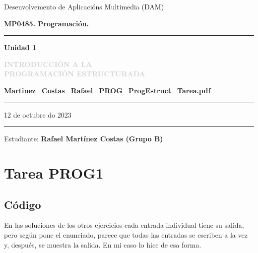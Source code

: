 \documentclass[a4paper,12pt]{article}
\def\curso{Desenvolvemento de Aplicacións Multimedia (DAM)}
\def\asignatura{MP0485. Programación.}
\def\ud{Unidad 1}
\def\titulo{INTRODUCCIÓN A LA\\
 PROGRAMACIÓN ESTRUCTURADA}
\def\numTarea{PROG1}
\def\filename{Martinez\_Costas\_Rafael\_PROG\_ProgEstruct\_Tarea.pdf}
\def\dateCreation{12 de octubre do 2023}
\def\estudiante{Rafael Martínez Costas (Grupo B)}
\begin{document}

\begin{titlepage}


      \vspace{-0.7 cm}
      \large \curso

      \vspace{-0.5 cm}
      \large\textbf{\asignatura}

      \rule{17cm}{0.5mm}
      \Large\textbf{\ud}
      \vspace{-0.5 cm}

      \huge\textcolor{lightgray}{\textbf{\titulo}}

      \vspace{0.6 cm}

      \large\textbf{\filename}

      \vspace{-0.8 cm}

      \rule{17cm}{0.5mm}

      \Large \dateCreation

      \vspace{11.6cm}
      \rule{17cm}{0.5mm}

      \vspace{-0.6 cm}
      \begin{flushright}
            \normalsize Estudiante:
            \normalsize\textbf{\estudiante}
      \end{flushright}

\end{titlepage}


\linespread{1.5}

\section{Tarea \numTarea}
\subsection{Código}
En las soluciones de los otros ejercicios cada entrada individual tiene su salida,
pero según pone el enunciado, parece que todas las entradas se escriben a la vez y,
después, se muestra la salida.
En mi caso lo hice de esa forma.
\end{document}
